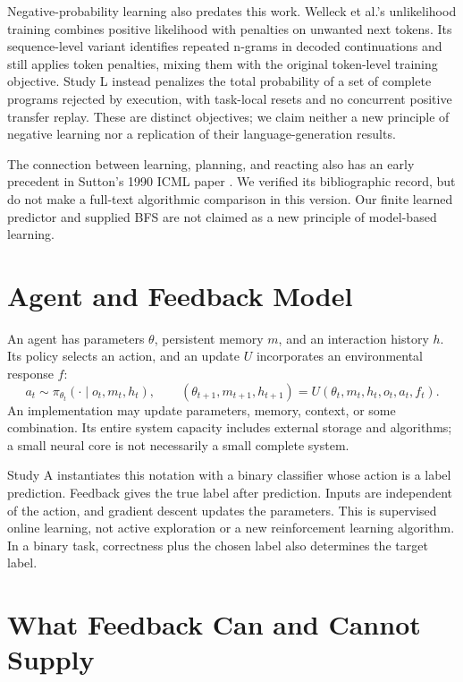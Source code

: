 \documentclass[11pt]{article}
\begin{document}
Negative-probability learning also predates this work. Welleck et al.'s
unlikelihood training \cite{unlikelihood} combines positive likelihood with
penalties on unwanted next tokens. Its sequence-level variant identifies
repeated n-grams in decoded continuations and still applies token penalties,
mixing them with the original token-level training objective. Study L instead
penalizes the total probability of a set of complete programs rejected by
execution, with task-local resets and no concurrent positive transfer replay.
These are distinct objectives; we claim neither a new principle of negative
learning nor a replication of their language-generation results.

The connection between learning, planning, and reacting also has an early
precedent in Sutton's 1990 ICML paper \cite{sutton1990}. We verified its
bibliographic record, but do not make a full-text algorithmic comparison in
this version. Our finite learned predictor and supplied BFS are not claimed
as a new principle of model-based learning.

\section{Agent and Feedback Model}
An agent has parameters $\theta$, persistent memory $m$, and an interaction
history $h$. Its policy selects an action, and an update $U$ incorporates an
environmental response $f$:
\[
 a_t\sim\pi_{\theta_t}(\cdot\mid o_t,m_t,h_t),\qquad
 (\theta_{t+1},m_{t+1},h_{t+1})=U(\theta_t,m_t,h_t,o_t,a_t,f_t).
\]
An implementation may update parameters, memory, context, or some combination.
Its entire system capacity includes external storage and algorithms; a small
neural core is not necessarily a small complete system.

Study A instantiates this notation with a binary classifier whose action is a
label prediction. Feedback gives the true label after prediction. Inputs are
independent of the action, and gradient descent updates the parameters. This
is supervised online learning, not active exploration or a new reinforcement
learning algorithm. In a binary task, correctness plus the chosen label also
determines the target label.

\section{What Feedback Can and Cannot Supply}
\end{document}
